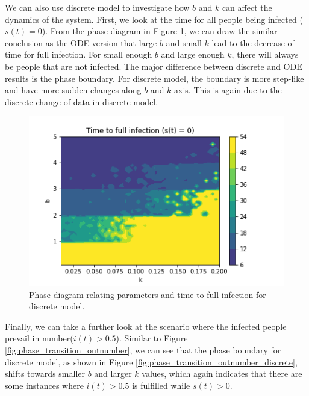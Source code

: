 \documentclass[12pt, reqno]{amsart}
\begin{document}
    \newpage
    We can also use discrete model to investigate how \(b\) and \(k\) can affect the dynamics of the system. First, we look at the time for all people being infected ($s(t) = 0$). From the phase diagram in Figure \ref{fig:phase_transition_full_infection_discrete}, we can draw the similar conclusion as the ODE version that large \(b\) and small \(k\) lead to the decrease of time for full infection. For small enough \(b\) and large enough \(k\), there will always be people that are not infected. The major difference between discrete and ODE results is the phase boundary. For discrete model, the boundary is more step-like and have more sudden changes along \(b\) and \(k\) axis. This is again due to the discrete change of data in discrete model. 
    
    \begin{figure}[h!]
        \centering
        \includegraphics[scale=0.8]{phase_transition_full_infection_discrete.png}
        \caption{Phase diagram relating parameters and time to full infection for discrete model.}
        \label{fig:phase_transition_full_infection_discrete}
    \end{figure}
    
   Finally, we can take a further look at the scenario where the infected people prevail in number($i(t) > 0.5$). Similar to Figure \ref{fig:phase_transition_outnumber}, we can see that the phase boundary for discrete model, as shown in Figure \ref{fig:phase_transition_outnumber_discrete}, shifts towards smaller \(b\) and larger \(k\) values, which again indicates that there are some instances where $i(t) > 0.5$ is fulfilled while $s(t) > 0$.
    
\end{document}
